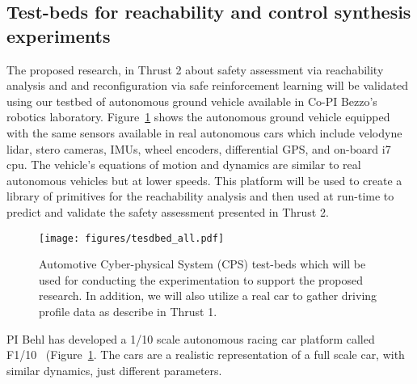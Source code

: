 \subsection{Test-beds for reachability and control synthesis experiments}
The proposed research, in Thrust 2 about safety assessment via reachability analysis and and reconfiguration via safe reinforcement learning will be validated using our testbed of autonomous ground vehicle available in Co-PI Bezzo's robotics laboratory. 
Figure~\ref{fig:all_experiments} shows the autonomous ground vehicle equipped with the same sensors available in real autonomous cars which include velodyne lidar, stero cameras, IMUs, wheel encoders, differential GPS, and on-board i7 cpu. The vehicle's equations of motion and dynamics are similar to real autonomous vehicles but at lower speeds. This platform will be used to create a library of primitives for the reachability analysis and then used at run-time to predict and validate the safety assessment presented in Thrust 2. 
\begin{figure}
    \centering
    \texttt{[image: figures/tesdbed\_all.pdf]}
    \caption{Automotive Cyber-physical System (CPS) test-beds which will be used for conducting the experimentation to support the proposed research. In addition, we will also utilize a real car to gather driving profile data as describe in Thrust 1. }
    \label{fig:all_experiments}
\end{figure}
PI Behl has developed a 1/10 scale autonomous racing car platform called F1/10~\cite{f1tenth} (Figure~\ref{fig:all_experiments}. The cars are a realistic representation of a full scale car, with similar dynamics, just different parameters. %
